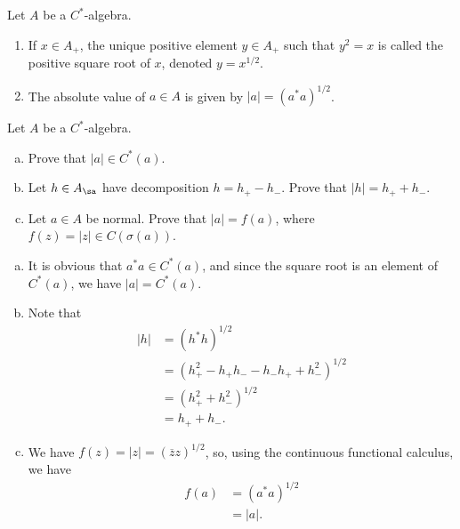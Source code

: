 \documentclass[10pt]{mypackage}
\begin{document}
\begin{definition}
  Let $A$ be a $C^{\ast}$-algebra.
  \begin{enumerate}[(1)]
    \item If $x\in A_{+}$, the unique positive element $y\in A_{+}$ such that $y^2 = x$ is called the positive square root of $x$, denoted $y = x^{1/2}$.
    \item The absolute value of $a\in A$ is given by $\left\vert a \right\vert = \left(a^{\ast}a\right)^{1/2}$.
  \end{enumerate}
\end{definition}
\begin{exercise}
  Let $A$ be a $C^{\ast}$-algebra.
  \begin{enumerate}[(a)]
    \item Prove that $\left\vert a \right\vert \in C^{\ast}\left(a\right)$.
    \item Let $h\in A_{\sa}$ have decomposition $ h =h_{+} - h_{-}$. Prove that $\left\vert h \right\vert = h_{+} + h_{-}$.
    \item Let $a\in A$ be normal. Prove that $\left\vert a \right\vert = f(a)$, where $f\left(z\right) = \left\vert z \right\vert \in C\left(\sigma\left(a\right)\right)$.
  \end{enumerate}
\end{exercise}
\begin{solution}\hfill
  \begin{enumerate}[(a)]
    \item It is obvious that $a^{\ast}a\in C^{\ast}\left(a\right)$, and since the square root is an element of $C^{\ast}\left(a\right)$, we have $\left\vert a \right\vert = C^{\ast}\left(a\right)$.
    \item Note that
      \begin{align*}
        \left\vert h \right\vert &= \left(h^{\ast}h\right)^{1/2}\\
                                 &= \left(h_{+}^2 - h_{+}h_{-} - h_{-}h_{+} + h_{-}^2\right)^{1/2}\\
                                 &= \left(h_{+}^2 + h_{-}^2\right)^{1/2}\\
                                 &= h_{+} + h_{-}.
      \end{align*}
    \item We have $f\left(z\right) = \left\vert z \right\vert = \left(\overline{z}z\right)^{1/2}$, so, using the continuous functional calculus, we have
      \begin{align*}
        f\left(a\right) &= \left(a^{\ast}a\right)^{1/2}\\
                        &= \left\vert a \right\vert.
      \end{align*}
  \end{enumerate}
\end{solution}
\end{document}
